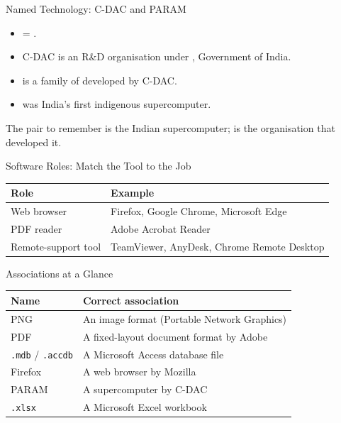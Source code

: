 \documentclass[aspectratio=169]{beamer}
\begin{document}
\begin{frame}{Named Technology: C-DAC and PARAM}
  \begin{itemize}
    \item {} = .
    \item C-DAC is an R\&D organisation under , Government of
      India.
    \item {} is a family of  developed by C-DAC.
    \item {} was India's first indigenous supercomputer.
  \end{itemize}
  \begin{block}{The pair to remember}
     is the Indian supercomputer;  is the organisation
    that developed it.
  \end{block}
\end{frame}

\begin{frame}{Software Roles: Match the Tool to the Job}
  \begin{center}
    \begin{tabular}{p{}p{}}
      \toprule
      \textbf{Role} & \textbf{Example} \\
      \midrule
      Web browser & Firefox, Google Chrome, Microsoft Edge \\
      PDF reader & Adobe Acrobat Reader \\
      Remote-support tool & TeamViewer, AnyDesk, Chrome Remote Desktop \\
      \bottomrule
    \end{tabular}
  \end{center}
  \vspace{0.25cm}
\end{frame}

\begin{frame}{Associations at a Glance}
  \begin{center}
    \begin{tabular}{p{}p{}}
      \toprule
      \textbf{Name} & \textbf{Correct association} \\
      \midrule
      PNG & An image format (Portable Network Graphics) \\
      PDF & A fixed-layout document format by Adobe \\
      \texttt{.mdb} / \texttt{.accdb} & A Microsoft Access database file \\
      Firefox & A web browser by Mozilla \\
      PARAM & A supercomputer by C-DAC \\
      \texttt{.xlsx} & A Microsoft Excel workbook \\
      \bottomrule
    \end{tabular}
  \end{center}
\end{frame}
\end{document}
